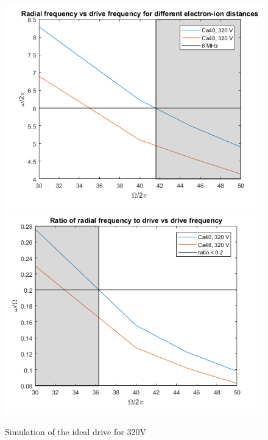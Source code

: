 \begin{figure}[h]
	\centering
	\includegraphics[width=\textwidth]{images/320V_left}
	\includegraphics[width=\textwidth]{images/320V_right}
	\label{fig:ideal_drive_320}
	\caption{Simulation of the ideal drive for 320V}
\end{figure}